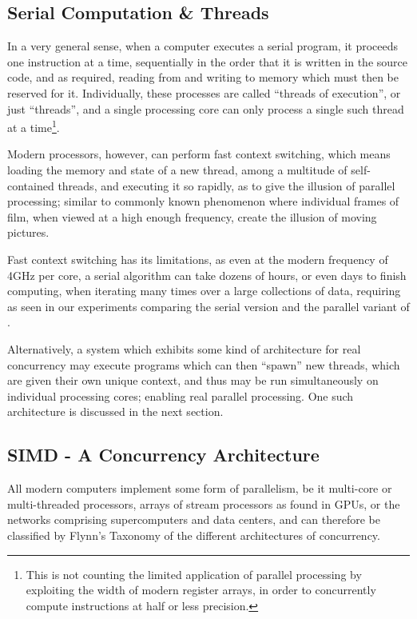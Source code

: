 %
%
%
%
\subsection{Serial Computation \& Threads}
\label{ch2sPPssSCT}
In a very general sense, when a computer executes a serial program, it proceeds one instruction at a time, sequentially in the order that it is written in the source code, and as required, reading from and writing to memory which must then be reserved for it. Individually, these processes are called ``threads of execution'', or just ``threads'', and a single processing core can only process a single such thread at a time\footnote{This is not counting the limited application of parallel processing by exploiting the width of modern register arrays, in order to concurrently compute instructions at half or less precision.}.

Modern processors, however, can perform fast context switching, which means loading the memory and state of a new thread, among a multitude of self-contained threads, and executing it so rapidly, as to give the illusion of parallel processing; similar to commonly known phenomenon where individual frames of film, when viewed at a high enough frequency, create the illusion of moving pictures.

Fast context switching has its limitations, as even at the modern frequency of 4GHz per core, a serial algorithm can take dozens of hours, or even days to finish computing, when iterating many times over a large collections of data, requiring as seen in our experiments comparing the serial version and the parallel variant of .

Alternatively, a system which exhibits some kind of architecture for real concurrency may execute programs which can then ``spawn'' new threads, which are given their own unique context, and thus may be run simultaneously on individual processing cores; enabling real parallel processing. One such architecture is discussed in the next section.

%
%
%
%
\subsection{SIMD - A Concurrency Architecture}
\label{ch2sPPssSACA}
All modern computers implement some form of parallelism, be it multi-core or multi-threaded processors, arrays of stream processors as found in GPUs, or the networks comprising supercomputers and data centers, and can therefore be classified by Flynn's Taxonomy of the different architectures of concurrency.

